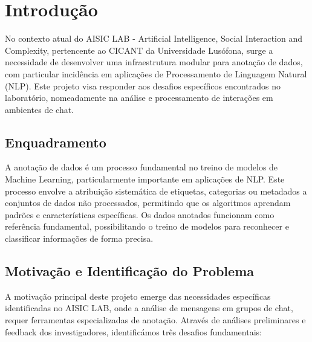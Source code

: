 \chapter{Introdução}

No contexto atual do AISIC LAB - Artificial Intelligence, Social Interaction and Complexity, pertencente ao CICANT da Universidade Lusófona, surge a necessidade de desenvolver uma infraestrutura modular para anotação de dados, com particular incidência em aplicações de Processamento de Linguagem Natural (NLP). Este projeto visa responder aos desafios específicos encontrados no laboratório, nomeadamente na análise e processamento de interações em ambientes de chat.

\section{Enquadramento}

A anotação de dados é um processo fundamental no treino de modelos de Machine Learning, particularmente importante em aplicações de NLP. Este processo envolve a atribuição sistemática de etiquetas, categorias ou metadados a conjuntos de dados não processados, permitindo que os algoritmos aprendam padrões e características específicas. Os dados anotados funcionam como referência fundamental, possibilitando o treino de modelos para reconhecer e classificar informações de forma precisa.

\section{Motivação e Identificação do Problema}

A motivação principal deste projeto emerge das necessidades específicas identificadas no AISIC LAB, onde a análise de mensagens em grupos de chat, requer ferramentas especializadas de anotação. 
Através de análises preliminares e feedback dos investigadores, identificámos três desafios fundamentais:

